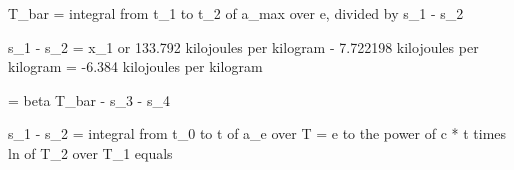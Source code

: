 T_bar = integral from t_1 to t_2 of a_max over e, divided by s_1 - s_2

s_1 - s_2 = x_1 or 133.792 kilojoules per kilogram - 7.722198 kilojoules per kilogram = -6.384 kilojoules per kilogram

= beta T_bar - s_3 - s_4

s_1 - s_2 = integral from t_0 to t of a_e over T = e to the power of c * t times ln of T_2 over T_1 equals